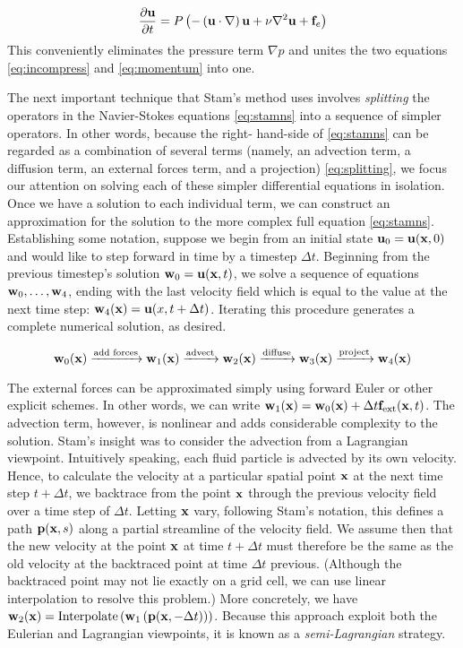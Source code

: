 \begin{equation}
\label{eq:stamns}
\frac{\partial \mathbf{u}}{\partial t} = P\left(-\left(\mathbf{u} \cdot \nabla \right)\mathbf{u} + \nu \nabla^{2}\mathbf{u} + \mathbf{f}_e\right)
\end{equation}
This conveniently eliminates the pressure term $\nabla p$ and unites the two equations \ref{eq:incompress} and \ref{eq:momentum} into one.

The next important technique that Stam's method uses involves {\em splitting} the operators in the Navier-Stokes equations \ref{eq:stamns} into a sequence of simpler operators. In other words, because the right-
hand-side of \ref{eq:stamns} can be regarded as a combination of several terms (namely, an advection term, a diffusion term, an external forces term, and a projection) \ref{eq:splitting}, we focus our attention on solving each of these simpler differential equations in isolation. Once we have a solution to each individual term, we can construct an approximation for the solution to the more complex full equation \ref{eq:stamns}. Establishing some notation, suppose we begin from an initial state $\mathbf{u}_0 = \mathbf{u}(\mathbf{x}, 0)$ and would like to step forward in time by a timestep $\Delta t$. Beginning from the previous timestep's solution $\mathbf{w}_0 = \mathbf{u}(\mathbf{x}, t)$, we solve a sequence of equations $\mathbf{w}_0, \dots, \mathbf{w}_4$, ending with the last velocity field which is equal to the value at the next time step: $\mathbf{w}_4(\mathbf{x}) = \mathbf{u}(x, t + \Delta t)$. Iterating this procedure generates a complete numerical solution, as desired.

\begin{equation}
\label{eq:splitting}
\mathbf{w}_0(\mathbf{x}) \xrightarrow{\text{add forces}} \mathbf{w}_1(\mathbf{x}) \xrightarrow{\text{advect}} \mathbf{w}_2(\mathbf{x}) \xrightarrow{\text{diffuse}} \mathbf{w}_3(\mathbf{x}) \xrightarrow{\text{project}} \mathbf{w}_4(\mathbf{x})
\end{equation}

The external forces can be approximated simply using forward Euler or other explicit schemes. In other words, we can write
$\mathbf{w}_1(\mathbf{x}) = \mathbf{w}_0(\mathbf{x}) + \Delta t \mathbf{f}_{\text{ext}}(\mathbf{x}, t)$. The advection term, however, is nonlinear and adds considerable complexity to the solution. Stam's insight was to consider the advection from a Lagrangian viewpoint. Intuitively speaking, each fluid particle is advected by its own velocity. Hence, to calculate the velocity at a particular spatial point $\mathbf{x}$ at the next time step $t + \Delta t$, we backtrace from the point $\mathbf{x}$ through the previous velocity field over a time step of $\Delta t$. Letting $\mathbf{x}$ vary, following Stam's notation, this defines a path $\mathbf{p}(\mathbf{x}, s)$ along a partial streamline of the velocity field. We assume then that the new velocity at the point $\mathbf{x}$ at time $t + \Delta t$ must therefore be the same as the old velocity at the backtraced point at time $\Delta t$ previous. (Although the backtraced point may not lie exactly on a grid cell, we can use linear interpolation to resolve this problem.) More concretely, we have $\mathbf{w}_2(\mathbf{x}) = \text{Interpolate}\left(\mathbf{w}_1\left(\mathbf{p}(\mathbf{x}, -\Delta t)\right)\right)$.
Because this approach exploit both the Eulerian and Lagrangian viewpoints, it is known as a {\em semi-Lagrangian} strategy.

